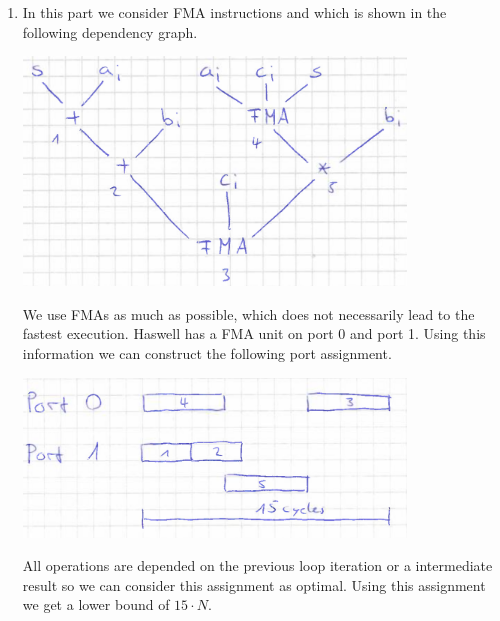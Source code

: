 \documentclass[a4paper]{article}
\begin{document}
\begin{enumerate}
\begin{enumerate}
        \newpage
        
        \item In this part we consider FMA instructions and which is shown in the following dependency graph.
        \begin{center}
        \includegraphics[width=0.8\textwidth]{fma_dep_tree.png}
        \end{center}
        We use FMAs as much as possible, which does not necessarily lead to the fastest execution. Haswell has a FMA unit on port 0 and port 1. Using this information we can construct the following port assignment.
        \begin{center}
        \includegraphics[width=0.8\textwidth]{fma_scheduling.png}
        \end{center}
        All operations are depended on the previous loop iteration or a intermediate result so we can consider this assignment as optimal. Using this assignment we get a lower bound of $15 \cdot N$.
    \end{enumerate}
\end{enumerate}

\printbibliography
\end{document}
